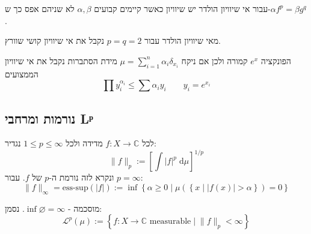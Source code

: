 \documentclass{tstextbook}
\begin{document}
\begin{remark}
עבור אי שיוויון הולדר יש שיוויון כאשר קיימים קבועים \(\alpha,\beta\) לא שניהם אפס כך ש-\(\alpha f^{p}=\beta g^{q}\). 

\end{remark}
\begin{remark}
מאי שיוויון הולדר עבור \(p=q=2\) נקבל את אי שיוויון קושי שוורץ.

\end{remark}
\begin{corollary}
הפונקציה \(e^{ x }\) קמורה ולכן אם ניקח \(\mu=\sum_{i=1}^{n}\alpha_{i}\delta_{x_{i}}\) מידת הסתברות נקבל את אי שיוויון הממצועים
$$\prod y_{i}^{\alpha _{i}}\leq \sum \alpha_{i}y_{i}\qquad y_{i}=e^{ x_{i} }$$

\end{corollary}
\subsection{נורמות ומרחבי Lᵖ}

\begin{definition}[נורמת \(p\) של \(f\)]
לכל \(f:X\to \mathbb{C}\) מדידה ולכל \(1\leq p \leq \infty\) נגדיר:
$$\lVert f \rVert _{p} := \left[ \int  \lvert f \rvert ^{p} \;\mathrm{d} \mu  \right]^{1/p}$$
ונקרא לזה נורמת ה-\(p\) של \(f\). עבור \(p=\infty\):
$$\lVert f \rVert _{\infty}=\text{ess-sup}\left( \lvert f \rvert  \right):= \inf \left\{  \alpha \geq 0 \mid \mu\left( \left\{  x\mid \lvert f(x) \rvert >\alpha  \right\} \right)=0  \right\}$$

\end{definition}
מוסכמה - \(\inf \varnothing = \infty\). נסמן:
$$\mathcal{L} ^{p}\left( \mu \right):=\left\{  f:X\to \mathbb{C} \text{ measurable}\mid \lVert f \rVert _{p}<\infty  
\right\}$$
\end{document}
